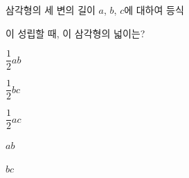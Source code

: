 삼각형의 세 변의 길이 $a$, $b$, $c$에 대하여 등식\par\smallskip{}\par\smallskip\noindent 이 성립할 때, 이 삼각형의 넓이는?
\begin{choices32}{\rule[-3ex]{0pt}{8ex}$\dfrac{1}{2}ab$}{\rule[-3ex]{0pt}{8ex}$\dfrac{1}{2}bc$}{\rule[-3ex]{0pt}{8ex}$\dfrac{1}{2}ac$}{\rule[-3ex]{0pt}{8ex}$ab$}{\rule[-3ex]{0pt}{8ex}$bc$}\end{choices32}
